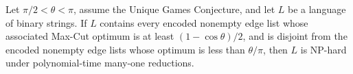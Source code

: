 \begin{theorem}
\label{BooleanAnalysis.GaussianSpace.UniqueGames.maxCut_ug_hard_separating_language}
\leanok
{}
Let $\pi/2<\theta<\pi$, assume the Unique Games Conjecture, and let $L$ be a language of
binary strings. If $L$ contains every encoded nonempty edge list whose associated
Max-Cut optimum is at least $(1-\cos\theta)/2$, and is disjoint from the encoded
nonempty edge lists whose optimum is less than $\theta/\pi$, then $L$ is NP-hard under
polynomial-time many-one reductions.
\end{theorem}
